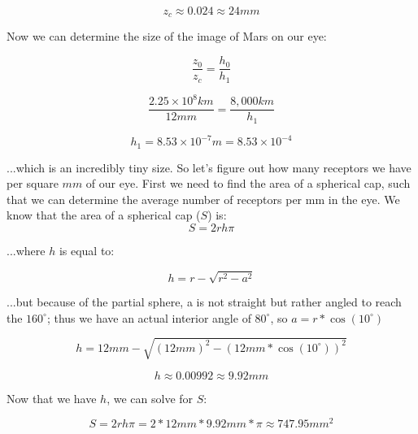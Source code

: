 \documentclass{article}
\begin{document}
\begin{equation}
    z_c \approx 0.024 \approx 24 mm
\end{equation}

Now we can determine the size of the image of Mars on our eye:

\begin{equation}
    \frac{z_0}{z_c} = \frac{h_0}{h_1}
\end{equation}

\begin{equation}
    \frac{2.25\times10^8km}{12mm} = \frac{8,000km}{h_1}
\end{equation}

\begin{equation}
    h_1 = 8.53\times10^{-7} m = 8.53\times10^{-4}
\end{equation}

\noindent ...which is an incredibly tiny size. So let's figure out how many receptors we have per square $mm$ of our eye. First we need to find the area of a spherical cap, such that we can determine the average number of receptors per mm in the eye. We know that the area of a spherical cap ($S$) is:
\begin{equation}
    S = 2rh\pi
\end{equation}

\noindent ...where $h$ is equal to:

\begin{equation}
    h=r - \sqrt{r^2 - a^2}
\end{equation}

\noindent ...but because of the partial sphere, a is not straight but rather angled to reach the $160^\circ$; thus we have an actual interior angle of $80^\circ$, so $a=r*\cos(10^\circ)$

\begin{equation}
    h = 12mm-\sqrt{(12mm)^2 - (12mm * \cos(10^\circ))^2}
\end{equation}

\begin{equation}
    h \approx 0.00992 \approx 9.92mm 
\end{equation}

\noindent Now that we have $h$, we can solve for $S$:

\begin{equation}
    S = 2rh\pi = 2*12mm*9.92mm*\pi \approx 747.95 mm^2
\end{equation}
\end{document}
